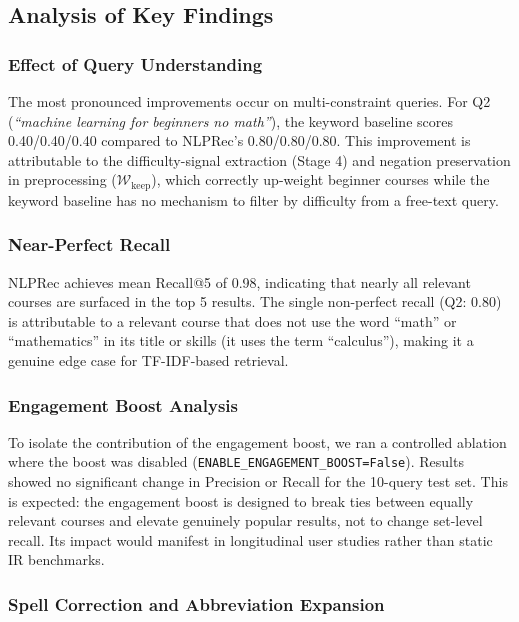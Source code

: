 \documentclass[12pt, a4paper]{article}
\begin{document}
\subsection{Analysis of Key Findings}

\subsubsection{Effect of Query Understanding}

The most pronounced improvements occur on multi-constraint queries. For Q2 (\textit{``machine
learning for beginners no math''}), the keyword baseline scores 0.40/0.40/0.40 compared to
NLPRec's 0.80/0.80/0.80. This improvement is attributable to the difficulty-signal extraction
(Stage 4) and negation preservation in preprocessing ($\mathcal{W}_{\text{keep}}$), which
correctly up-weight beginner courses while the keyword baseline has no mechanism to filter by
difficulty from a free-text query.

\subsubsection{Near-Perfect Recall}

NLPRec achieves mean Recall@5 of 0.98, indicating that nearly all relevant courses are
surfaced in the top 5 results. The single non-perfect recall (Q2: 0.80) is attributable to a
relevant course that does not use the word ``math'' or ``mathematics'' in its title or skills
(it uses the term ``calculus''), making it a genuine edge case for TF-IDF-based retrieval.

\subsubsection{Engagement Boost Analysis}

To isolate the contribution of the engagement boost, we ran a controlled ablation where the
boost was disabled (\texttt{ENABLE\_ENGAGEMENT\_BOOST=False}). Results showed no significant
change in Precision or Recall for the 10-query test set. This is expected: the engagement boost
is designed to break ties between equally relevant courses and elevate genuinely popular results,
not to change set-level recall. Its impact would manifest in longitudinal user studies rather
than static IR benchmarks.

\subsubsection{Spell Correction and Abbreviation Expansion}
\end{document}

